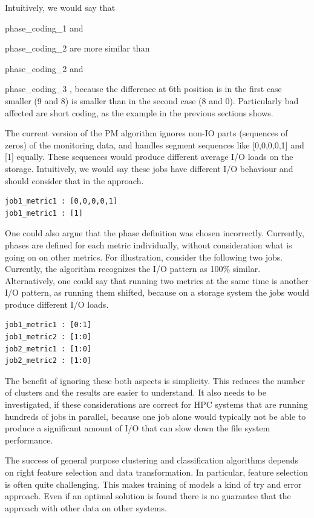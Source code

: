 \documentclass[]{llncs}
\begin{document}
Intuitively, we would say that {phase\_coding\_1 and{ phase\_coding\_2 are more similar than {phase\_coding\_2 and {phase\_coding\_3 , because the difference at 6th position is in the first case smaller (9 and 8) is smaller than in the second case (8 and 0).
Particularly bad affected are short coding, as the example in the previous sections shows.

The current version of the PM algorithm ignores non-IO parts (sequences of zeros) of the monitoring data, and  handles segment sequences like [0,0,0,0,1] and [1] equally.
These sequences would produce different average I/O loads on the storage.
Intuitively, we would say these jobs have different I/O behaviour and should consider that in the approach.


\begin{lstlisting}
job1_metric1 : [0,0,0,0,1]
job1_metric1 : [1]
\end{lstlisting}

One could also argue that the phase definition was chosen incorrectly.
Currently, phases are defined for each metric individually, without consideration what is going on on other metrics.
For illustration, consider the following two jobs.
Currently, the algorithm recognizes the I/O pattern as 100$\%$  similar.
Alternatively, one could say that running two metrics at the same time is another I/O pattern, as running them shifted, because on a storage system the jobs would produce different I/O loads.

\begin{lstlisting}
job1_metric1 : [0:1]
job1_metric2 : [1:0]
job2_metric1 : [1:0]
job2_metric2 : [1:0]
\end{lstlisting}

The benefit of ignoring these both aspects is simplicity.
This reduces the number of clusters and the results are easier to understand.
It also needs to be investigated, if these considerations are correct for HPC systems that are running hundreds of jobs in parallel, because one job alone would typically not be able to produce a significant amount of I/O that can slow down the file system performance.

The success of general purpose clustering and classification algorithms depends on right feature selection and data transformation.
In particular, feature selection is often quite challenging.
This makes training of models a kind of try and error approach.
Even if an optimal solution is found there is no guarantee that the approach with other data on other systems.

}}}}
\end{document}
